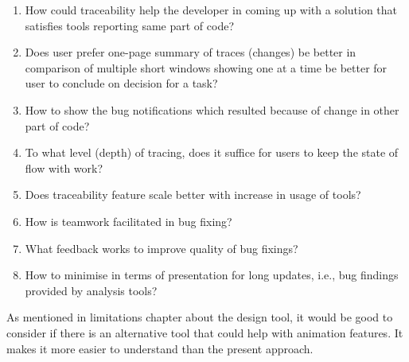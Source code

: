\begin{enumerate}
\item How could traceability help the developer in coming up with a solution that satisfies tools reporting same part of code?
\item Does user prefer one-page summary of traces (changes) be better in comparison of multiple short windows showing one at a time be better for user to conclude on decision for a task?
\item How to show the bug notifications which resulted because of change in other part of code?
\item To what level (depth) of tracing, does it suffice for users to keep the state of flow with work?
\item Does traceability feature scale better with increase in usage of tools?
\item How is teamwork facilitated in bug fixing?
\item What feedback works to improve quality of bug fixings? 
\item How to minimise in terms of presentation for long updates, i.e., bug findings provided by analysis tools?
\end{enumerate}


As mentioned in limitations chapter about the design tool, it would be good to consider if there is an alternative tool that could help with animation features.  It makes it more easier to understand than the present approach.